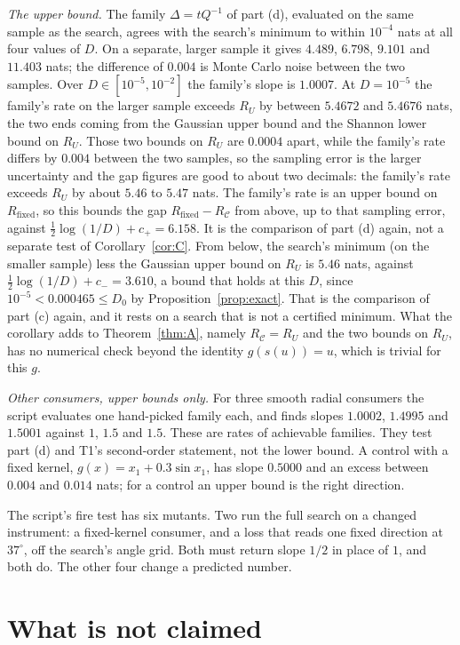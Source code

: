 \documentclass[11pt,onecolumn]{IEEEtran}
\newcommand{\Rfix}{R_{\mathrm{fixed}}}
\newcommand{\RC}{R_{\mathcal C}}
\begin{document}
\emph{The upper bound.} The family $\Delta=tQ^{-1}$ of part (d), evaluated on the same
sample as the search, agrees with the search's minimum to within $10^{-4}$ nats at all
four values of $D$. On a separate, larger sample it gives $4.489$, $6.798$, $9.101$ and
$11.403$ nats; the difference of $0.004$ is Monte Carlo noise between the two samples. Over
$D\in[10^{-5},10^{-2}]$ the family's slope is $1.0007$. At $D=10^{-5}$ the family's rate on the larger
sample exceeds $R_U$ by between $5.4672$ and $5.4676$ nats, the two ends coming from the
Gaussian upper bound and the Shannon lower bound on $R_U$. Those two bounds on $R_U$ are
$0.0004$ apart, while the family's rate differs by $0.004$ between the two samples, so
the sampling error is the larger uncertainty and the gap figures are good to about two
decimals: the family's rate exceeds $R_U$ by about $5.46$ to $5.47$ nats. The family's
rate is an upper bound on $\Rfix$, so this bounds the gap $\Rfix-\RC$ from above, up to
that sampling error, against $\tfrac12\log(1/D)+c_+=6.158$. It is the comparison of part
(d) again, not a separate test of Corollary~\ref{cor:C}. From below, the search's minimum
(on the smaller sample) less the Gaussian upper bound on $R_U$ is $5.46$ nats, against
$\tfrac12\log(1/D)+c_-=3.610$, a bound that holds at this $D$, since $10^{-5}<0.000465\le D_0$ by
Proposition~\ref{prop:exact}.
That is the comparison of part (c) again, and it rests on a search that is not a
certified minimum. What the corollary adds to Theorem~\ref{thm:A}, namely $\RC=R_U$ and
the two bounds on $R_U$, has no numerical check beyond the identity $g(s(u))=u$, which is
trivial for this $g$.

\emph{Other consumers, upper bounds only.} For three smooth radial consumers the script
evaluates one hand-picked family each, and finds slopes $1.0002$, $1.4995$ and $1.5001$
against $1$, $1.5$ and $1.5$. These are rates of achievable families. They test part
(d) and T1's second-order statement, not the lower bound. A control with a fixed kernel,
$g(x)=x_1+0.3\sin x_1$, has slope $0.5000$ and an excess between $0.004$ and $0.014$
nats; for a control an upper bound is the right direction.

The script's fire test has six mutants. Two run the full search on a changed instrument:
a fixed-kernel consumer, and a loss that reads one fixed direction at $37^\circ$, off the
search's angle grid. Both must return slope $1/2$ in place of $1$, and both do. The
other four change a predicted number.

\section{What is not claimed}
\end{document}
